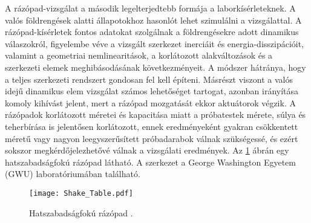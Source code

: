 A rázópad-vizsgálat a második legelterjedtebb formája a laborkísérleteknek. A valós földrengések alatti állapotokhoz hasonlót lehet szimulálni a vizsgálattal. A rázópad-kísérletek fontos adatokat szolgálnak a földrengésekre adott dinamikus válaszokról, figyelembe véve a vizsgált szerkezet inerciáit és energia-disszipációit, valamint a geometriai nemlinearitások, a korlátozott alakváltozások  és a szerkezeti elemek meghibásodásának következményeit. A módszer hátránya, hogy a teljes szerkezeti rendszert gondosan fel kell építeni. Másrészt viszont a  valós idejű dinamikus elem vizsgálat számos lehetőséget tartogat, azonban irányítása komoly kihívást jelent, mert a rázópad mozgatását ekkor aktuátorok végzik.  A rázópadok korlátozott méretei és kapacitása miatt a próbatestek mérete, súlya és teherbírása is jelentősen korlátozott, ennek eredményeként gyakran csökkentett méretű vagy nagyon leegyszerűsített próbadarabok válnak szükségessé, és ezért sokszor megkérdőjelezhetővé válnak a vizsgálati eredmények.
Az \ref{fig:shaking} ábrán egy hatszabadságfokú rázópad látható. A szerkezet a George Washington Egyetem (GWU) laboratóriumában található.

\begin{figure}[h!bt]
\centering
\texttt{[image: Shake\_Table.pdf]}
\caption{Hatszabadságfokú rázópad \cite{shaking}.}
\label{fig:shaking}
\end{figure}

